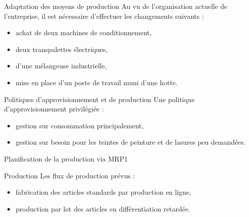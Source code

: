 
\begin{frame}{Adaptation des moyens de production}
	Au vu de l'organisation actuelle de l'entreprise,
	il est nécessaire d'effectuer les changements suivants :
	
	\begin{itemize}
		\item<1-> achat de deux machines de conditionnement,
		\item<2-> deux transpalettes électriques,
		\item<3-> d'une mélangeuse industrielle,
		\item<4-> mise en place d'un poste de travail muni d'une hotte.
	\end{itemize}
	
\end{frame}

\begin{frame}{Politiques d'approvisionnement et de production}
	Une politique d'approvisionnement privilégiée :
	\begin{itemize}
		\item<1-> gestion sur consommation principalement,
		\item<2-> gestion sur besoin pour les teintes de peinture
		et de lasures peu demandées.
	\end{itemize}
	\begin{center}
		\item<3->{Planification de la production via MRP1}
	\end{center}
\end{frame}

\begin{frame}{Production}
	Les flux de production prévus :
	\begin{itemize}
	\item<1-> fabrication des articles standards par production en ligne,
	\item<2-> production par lot des articles en différentiation retardée.
	\end{itemize}
\end{frame}

